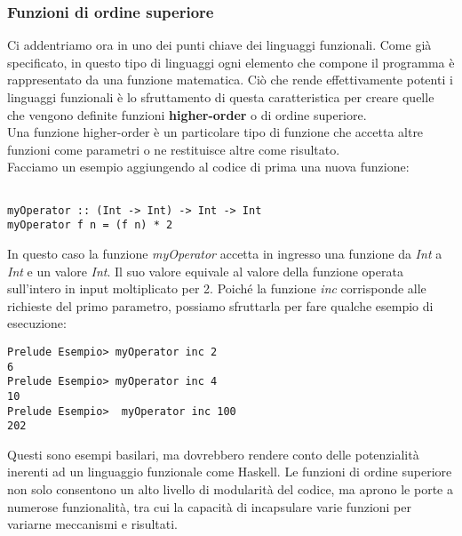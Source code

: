 \subsubsection{Funzioni di ordine superiore}
Ci addentriamo ora in uno dei punti chiave dei linguaggi funzionali. Come già specificato, in questo tipo di linguaggi ogni elemento che compone il programma è rappresentato da una funzione matematica. Ciò che rende effettivamente potenti i linguaggi funzionali è lo sfruttamento di questa caratteristica per creare quelle che vengono definite funzioni \textbf{higher-order} o di ordine superiore.\\
Una funzione higher-order è un particolare tipo di funzione che accetta altre funzioni come parametri o ne restituisce altre come risultato.\\
Facciamo un esempio aggiungendo al codice di prima una nuova funzione:
\begin{verbatim}

myOperator :: (Int -> Int) -> Int -> Int
myOperator f n = (f n) * 2 

\end{verbatim}
In questo caso la funzione \textit{myOperator} accetta in ingresso una funzione da \textit{Int} a \textit{Int} e un valore \textit{Int}. Il suo valore equivale al valore della funzione operata sull'intero in input moltiplicato per 2. Poiché la funzione \textit{inc} corrisponde alle richieste del primo parametro, possiamo sfruttarla per fare qualche esempio di esecuzione:
\begin{verbatim}
Prelude Esempio> myOperator inc 2
6
Prelude Esempio> myOperator inc 4
10
Prelude Esempio>  myOperator inc 100
202
\end{verbatim}
Questi sono esempi basilari, ma dovrebbero rendere conto delle potenzialità inerenti ad un linguaggio funzionale come Haskell. Le funzioni di ordine superiore non solo consentono un alto livello di modularità del codice, ma aprono le porte a numerose funzionalità, tra cui la capacità di incapsulare varie funzioni per variarne meccanismi e risultati.
